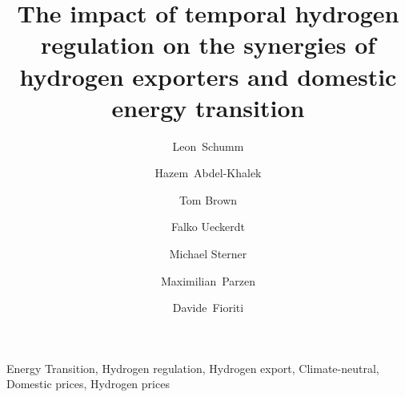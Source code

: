 \documentclass[5p]{elsarticle}
\begin{document}
\begin{frontmatter}

	\title{The impact of temporal hydrogen regulation on the synergies of hydrogen exporters and domestic energy transition}
    
	\author[tub,oth]{Leon~Schumm}
	\author[ieg,alu]{Hazem~Abdel-Khalek}
	\author[tub]{Tom Brown}
	\author[pik]{Falko Ueckerdt}
	\author[oth]{Michael Sterner}
	\author[uoe]{Maximilian~Parzen}
	\author[unipi]{Davide~Fioriti}


	\address[tub]{Department of Digital Transformation in Energy Systems, Institute of Energy Technology, Technische Universität Berlin, Fakultät III, Einsteinufer 25 (TA 8), 10587 Berlin, Germany\,}
	\address[oth]{Research Center on Energy Transmission and Storage (FENES), Faculty of Electrical and Information Technology, University of Applied Sciences (OTH) Regensburg, Seybothstr. 2, 93053 Regensburg, Germany}
	\address[ieg]{Fraunhofer Research Institution for Energy Infrastructures and Geothermal Systems IEG, Gulbener Straße 23, 03046 Cottbus, Germany}
	\address[alu]{Albert-Ludwigs Universität Freiburg, Faculty of Environment and Natural Resources, Tennenbacher Str. 4, 79106 Freiburg im Breisgau, Germany}
	\address[pik]{Potsdam Institute for Climate Impact Research, Telegrafenberg, 14473 Potsdam, Germany}
	\address[uoe]{University of Edinburgh, Institute for Energy Systems, EH9 3DW Edinburgh, United Kingdom}
	\address[unipi]{University of Pisa, Department of Energy Systems, Territory and Construction Engineering, Largo Lucio Lazzarino, 56122 Pisa, Italy}

	\begin{abstract}
		
	\end{abstract}

	\begin{keyword}
		Energy Transition, Hydrogen regulation, Hydrogen export, Climate-neutral, Domestic prices, Hydrogen prices
	\end{keyword}




\end{frontmatter}
\end{document}
